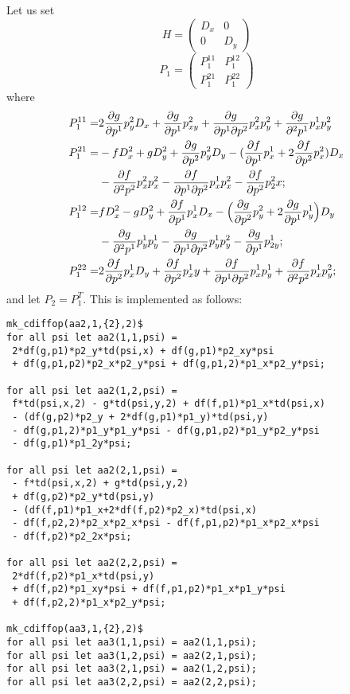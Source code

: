 Let us set
\begin{equation}
  \label{eq:19}
  H=
  \begin{pmatrix}
    D_x & 0 \\ 0 & D_y
  \end{pmatrix}
\end{equation}
\begin{equation}
  P_1=
  \begin{pmatrix}
    P_1^{11} & P_1^{12}
    \\
    P_1^{21} & P_1^{22}
  \end{pmatrix}
\end{equation}
where
\begin{align*}
  P_1^{11} = &
    2 \pd{g}{p^1} p^2_y D_x +
    \pd{g}{p^1} p^2_{xy}  + \pd{g}{p^1\partial p^2} p^2_x p^2_y  +
    \pd{g}{^2p^1} p^1_x p^2_y
    \\
   P_1^{21}=& -f D^2_x
  + g D_y^2 +
  \pd{g}{p^2} p^2_y D_y -
  (\pd{f}{p^1} p^1_x+2 \pd{f}{p^2} p^2_x) D_x
  \\ &
    - \pd{f}{^2p^2} p^2_x p^2_x  - \pd{f}{p^1\partial p^2} p^1_x p^2_x 
    - \pd{f}{p^2} p^2_2x ;
  \\
P_1^{12}=&    f D_x^2 - g D_y^2
  + \pd{f}{p^1} p^1_x D_x -
  \Big(\pd{g}{p^2} p^2_y + 2 \pd{g}{p^1} p^1_y\Big) D_y
  \\
  & - \pd{g}{^2p^1} p^1_y p^1_y  - \pd{g}{p^1\partial p^2} p^1_y p^2_y
  - \pd{g}{p^1} p^1_{2y} ;
  \\
P_1^{22}=&    2 \pd{f}{p^2} p^1_x D_y
  + \pd{f}{p^2} p^1_xy  + \pd{f}{p^1\partial p^2} p^1_x p^1_y 
  + \pd{f}{^2p^2} p^1_x p^2_y ;
\end{align*}
and let $P_2 = P_1^T$. This is implemented as follows:
\begin{verbatim}
mk_cdiffop(aa2,1,{2},2)$
for all psi let aa2(1,1,psi) =
 2*df(g,p1)*p2_y*td(psi,x) + df(g,p1)*p2_xy*psi
 + df(g,p1,p2)*p2_x*p2_y*psi + df(g,p1,2)*p1_x*p2_y*psi;

for all psi let aa2(1,2,psi) =
 f*td(psi,x,2) - g*td(psi,y,2) + df(f,p1)*p1_x*td(psi,x)
 - (df(g,p2)*p2_y + 2*df(g,p1)*p1_y)*td(psi,y)
 - df(g,p1,2)*p1_y*p1_y*psi - df(g,p1,p2)*p1_y*p2_y*psi
 - df(g,p1)*p1_2y*psi;

for all psi let aa2(2,1,psi) =
 - f*td(psi,x,2) + g*td(psi,y,2)
 + df(g,p2)*p2_y*td(psi,y)
 - (df(f,p1)*p1_x+2*df(f,p2)*p2_x)*td(psi,x)
 - df(f,p2,2)*p2_x*p2_x*psi - df(f,p1,p2)*p1_x*p2_x*psi
 - df(f,p2)*p2_2x*psi;

for all psi let aa2(2,2,psi) =
 2*df(f,p2)*p1_x*td(psi,y)
 + df(f,p2)*p1_xy*psi + df(f,p1,p2)*p1_x*p1_y*psi
 + df(f,p2,2)*p1_x*p2_y*psi;

mk_cdiffop(aa3,1,{2},2)$
for all psi let aa3(1,1,psi) = aa2(1,1,psi);
for all psi let aa3(1,2,psi) = aa2(2,1,psi);
for all psi let aa3(2,1,psi) = aa2(1,2,psi);
for all psi let aa3(2,2,psi) = aa2(2,2,psi);
\end{verbatim}
